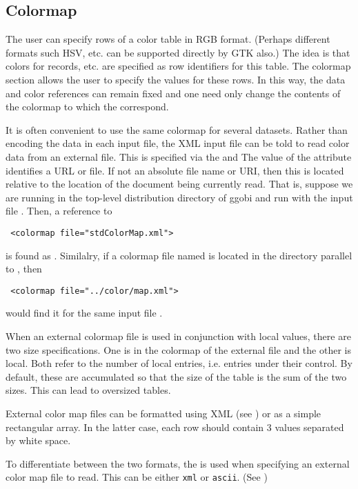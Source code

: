 \documentclass{article}
\def\XMLAttribute#1{\Escape{#1}}
\begin{document}
\subsection{Colormap}
The user can specify rows of a color table in RGB format.  (Perhaps
different formats such HSV, etc. can be supported directly by GTK
also.)  The idea is that colors for records, etc.  are specified as
row identifiers for this table.  The colormap section allows the user
to specify the values for these rows.  In this way, the data and color
references can remain fixed and one need only change the contents of
the colormap to which the correspond.

It is often convenient to use the same colormap for several
datasets. Rather than encoding the data in each input file, the XML
input file can be told to read color data from an external file.  This
is specified via the \XMLAttribute{file} and \XMLAttribute{type} The
value of the \XMLAttribute{file} attribute identifies a URL or
file. If not an absolute file name or URI, then this is located
relative to the location of the document being currently read.
That is, suppose we are running in the top-level distribution
directory of ggobi and run with the input file .
Then, a reference to 
\begin{verbatim}
 <colormap file="stdColorMap.xml">
\end{verbatim}
is found as .
Similalry, if a colormap file named  is located
in the directory  parallel to ,
then
\begin{verbatim}
 <colormap file="../color/map.xml">
\end{verbatim}
would find it for the same input file .

When an external colormap file is used in conjunction with local
values, there are two size specifications.  One is in the colormap of
the external file and the other is local. Both refer to the number of
local entries, i.e. entries under their control.  By default, these
are accumulated so that the size of the table is the sum of the two
sizes.  This can lead to oversized tables.






External color map files can be formatted using XML (see
) or as a simple rectangular array.  In the
latter case, each row should contain 3 values separated by white
space.


To differentiate between the two formats, the \XMLAttribute{type} is
used when specifying an external color map file to read.  This can be
either \texttt{xml} or \texttt{ascii}.  (See )
\end{document}
